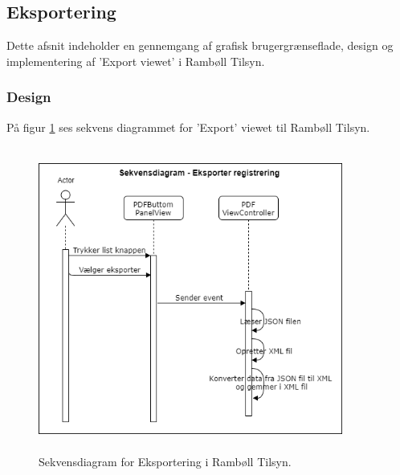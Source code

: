 \subsection{Eksportering} \label{sec:Login}
Dette afsnit indeholder en gennemgang af grafisk brugergrænseflade, design og implementering af 'Export viewet' i Rambøll Tilsyn.

\subsubsection{Design}
På figur \ref{fig:EksporterSekvensDiagram} ses sekvens diagrammet for 'Export' viewet til Rambøll Tilsyn.
\begin{figure}[H] %
	\centering
	\includegraphics[height=10cm, width=10cm]{../ArkitekturDesign/Design/Eksportering/EksporterSekvensDiagram}
	\caption{Sekvensdiagram for Eksportering i Rambøll Tilsyn.}
	\label{fig:EksporterSekvensDiagram}
\end{figure}

\clearpage

